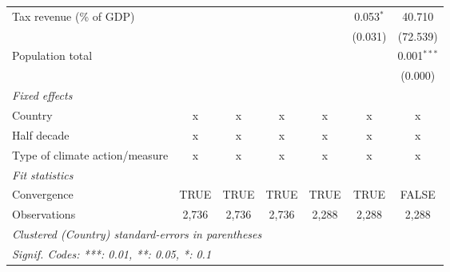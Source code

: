 \begin{tabular}{lcccccc}
   Tax revenue (\% of GDP)                               &              &               &               &               & 0.053$^{*}$   & 40.710\\   
                                                         &              &               &               &               & (0.031)       & (72.539)\\   
   Population total                                      &              &               &               &               &               & 0.001$^{***}$\\   
                                                         &              &               &               &               &               & (0.000)\\   
   \emph{Fixed effects}\\
   Country                                               & x            & x             & x             & x             & x             & x\\  
   Half decade                                           & x            & x             & x             & x             & x             & x\\  
   Type of climate action/measure                        & x            & x             & x             & x             & x             & x\\  
   \midrule \emph{Fit statistics}\\
   Convergence                                           &TRUE          & TRUE          & TRUE          & TRUE          & TRUE          & FALSE\\  
   Observations                                          & 2,736        & 2,736         & 2,736         & 2,288         & 2,288         & 2,288\\  
   \midrule
   \multicolumn{7}{l}{\emph{Clustered (Country) standard-errors in parentheses}}\\
   \multicolumn{7}{l}{\emph{Signif. Codes: ***: 0.01, **: 0.05, *: 0.1}}\\
\end{tabular}
\par\endgroup


